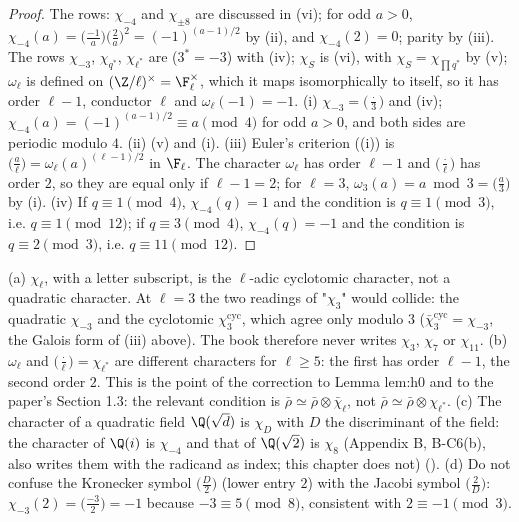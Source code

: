 \begin{proof}
The rows: $\chi_{-4}$ and $\chi_{\pm8}$ are discussed in (vi); for odd $a>0$, $\chi_{-4}(a)=\bigl(\frac{-1}a\bigr)\bigl(\frac2a\bigr)^2=(-1)^{(a-1)/2}$ by
(ii), and $\chi_{-4}(2)=0$; parity by (iii). The rows $\chi_{-3}$, $\chi_{q^*}$, $\chi_{\ell^*}$ are 
($3^*=-3$) with (iv); $\chi_S$ is (vi), with $\chi_S=\chi_{\prod q^*}$ by (v);
$\omega_\ell$ is defined on $(\Z/\ell)^\times=\F_\ell^\times$, which it maps isomorphically to itself, so it has order $\ell-1$, conductor $\ell$ and $\omega_\ell(-1)=-1$.
(i) $\chi_{-3}=\bigl(\frac\cdot3\bigr)$ and (iv); $\chi_{-4}(a)=(-1)^{(a-1)/2}\equiv a\pmod4$ for odd $a>0$, and both sides are periodic modulo $4$.
(ii) (v) and (i).
(iii) Euler's criterion ((i)) is $\bigl(\frac a\ell\bigr)=\omega_\ell(a)^{(\ell-1)/2}$ in $\F_\ell$. The character $\omega_\ell$ has order $\ell-1$ and $\bigl(\frac\cdot\ell\bigr)$ has
order $2$, so they are equal only if $\ell-1=2$; for $\ell=3$, $\omega_3(a)=a\bmod3=\bigl(\frac a3\bigr)$ by (i).
(iv) If $q\equiv1\pmod4$, $\chi_{-4}(q)=1$ and the condition is $q\equiv1\pmod3$, i.e. $q\equiv1\pmod{12}$; if $q\equiv3\pmod4$, $\chi_{-4}(q)=-1$ and the condition is
$q\equiv2\pmod3$, i.e. $q\equiv11\pmod{12}$.
\end{proof}

\begin{warning}\label{warn:rings:names}
(a) $\chi_\ell$, with a letter subscript, is the $\ell$-adic cyclotomic character, not a quadratic character. At $\ell=3$ the two readings of "$\chi_3$"
would collide: the quadratic $\chi_{-3}$ and the cyclotomic $\chi_3^{\mathrm{cyc}}$, which agree only modulo $3$ ($\bar\chi_3^{\mathrm{cyc}}=\chi_{-3}$, the Galois form of
(iii) above). The book therefore never writes $\chi_3$, $\chi_7$ or $\chi_{11}$. (b) $\omega_\ell$ and $\bigl(\frac\cdot\ell\bigr)=\chi_{\ell^*}$ are different characters for
$\ell\ge5$: the first has order $\ell-1$, the second order $2$. This is the point of the correction to Lemma lem:h0 and to the paper's
Section 1.3: the relevant condition is $\bar\rho\simeq\bar\rho\otimes\bar\chi_\ell$, not $\bar\rho\simeq\bar\rho\otimes\chi_{\ell^*}$. (c) The character of a quadratic field $\Q(\sqrt d)$ is
$\chi_D$ with $D$ the discriminant of the field: the character of $\Q(i)$ is $\chi_{-4}$ and that of $\Q(\sqrt2)$ is $\chi_8$ (Appendix B, B-C6(b), also writes
them with the radicand as index; this chapter does not) (). (d) Do not confuse the Kronecker
symbol $\bigl(\frac D2\bigr)$ (lower entry $2$) with the Jacobi symbol $\bigl(\frac2D\bigr)$: $\chi_{-3}(2)=\bigl(\frac{-3}2\bigr)=-1$ because $-3\equiv5\pmod8$, consistent with $2\equiv-1\pmod3$.
\end{warning}


